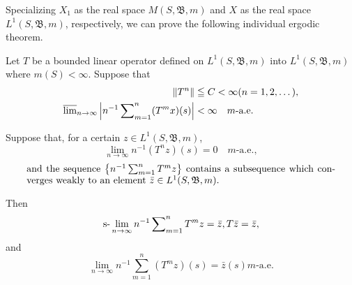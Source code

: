 Specializing $X_{1}$ as the real space $M(S, \mathfrak{B}, m)$ and $X$ as the real space $L^{1}(S, \mathfrak{B}, m)$, respectively, we can prove the following individual ergodic theorem. 

\begin{theorem}\label{thm:XIII.2.Theorem.2} Let $T$ be a bounded linear operator defined on $L^{1}(S, \mathfrak{B}, m)$ into $L^{1}(S, \mathfrak{B}, m)$ where $m(S) < \infty$. Suppose that 
\begin{align}
\left\| T ^{n} \right\|& \leqq C < \infty (n = 1, 2, \dots), \label{eq:XIII.2.9} \\
\varlimsup\limits_{n \rightarrow \infty} \left| n ^{-1} \sum\limits_{m=1} ^{n} (T ^{m} x) (s) \right|& < \infty \quad m\text{-a.e.} \label{eq:XIII.2.10}
\end{align}
\end{theorem}

Suppose that, for a certain $z \in L^{1}(S, \mathfrak{B}, m)$, 
\begin{equation}\label{eq:XIII.2.11}
\lim\limits _{n \rightarrow \infty} n ^{-1} (T ^{n} z) (s) = 0 \quad m\text{-a.e.},
\end{equation}
\begin{equation}\label{eq:XIII.2.12}
\parbox{0.92\linewidth}{\everymath{}\let\limits\nolimits and the sequence $\left\{n^{-1}\sum\limits_{m=1}^{n}T^{m}z\right\}$ contains a subsequence which converges weakly to an element $\bar{z} \in L^{1}(S, \mathfrak{B}, m)$.}
\end{equation}


Then 
\begin{equation}\label{eq:XIII.2.13}
\slim _{n \to \infty} n ^{-1} \sum\limits_{m=1} ^{n} T ^{m} z = \bar {z}, T \bar {z} = \bar {z},
\end{equation}
and 
\begin{equation}\label{eq:XIII.2.14}
\lim\limits _{n \rightarrow \infty} n ^{-1} \sum\limits_{m=1} ^{n} (T ^{m} z) (s) = \bar {z} (s) m\text{-a.e.}
\end{equation}

